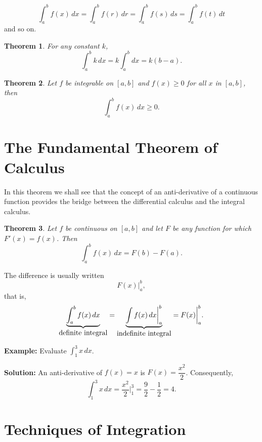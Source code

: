 \documentclass[titlepage,a4paper,12pt]{report}
\newtheorem{theorem}{Theorem}[section]
\begin{document}
\begin{equation*}
\int _{a}^b f(x)\, dx =\int _{a}^b f(r)\, dr =\int _{a}^b f(s)\, ds =\int _{a}^b f(t)\, dt
\end{equation*}
and so on.
\begin{theorem}
For any constant $k$, 
\begin{equation*}
\int _{a}^b k\, dx =k\int _{a}^b dx=k(b-a).
\end{equation*}
\end{theorem}
\begin{theorem}
Let $f$ be integrable on $[a,b]$ and $f(x)\geq 0$ for all $x$ in $[a,b]$, then 
\begin{equation*}
\int _{a}^b f(x)\, dx\geq 0.
\end{equation*}
\end{theorem}
\section{The Fundamental Theorem of Calculus}
In this theorem we shall see that the concept of an anti-derivative of a continuous function provides the bridge between the differential calculus and the integral calculus. 
\begin{theorem}
Let $f$ be continuous on $[a,b]$ and let $F$ be any function for which $F'(x)=f(x)$. Then 
\begin{equation*}
\int _{a}^b f(x)\, dx=F(b)-F(a).
\end{equation*}
\end{theorem}
\noindent The difference is usually written 
\begin{equation*}
F(x)\biggl|_{a}^b,
\end{equation*} 
that is, 
\begin{equation*}
\underbrace{\int _a^b f(x)\, dx}_{\hbox{definite integral}} =\underbrace{\int f(x)\, dx\biggl|_a^b}_{\hbox{indefinite integral}} =F(x)\biggl|_{a}^b.
\end{equation*}

\noindent \textbf{Example:} Evaluate $\displaystyle \int _{1}^3 x\, dx$.

\noindent \textbf{Solution:} An anti-derivative  of $f(x)=x$ is $F(x)=\dfrac{x^2}{2}$. Consequently, 
\begin{equation*}
\int _{1}^3 x\, dx =\dfrac{x^2}{2}\biggl|_{1}^3=\dfrac{9}{2}-\dfrac{1}{2}=4.
\end{equation*}
\section{Techniques of Integration}
\end{document}
